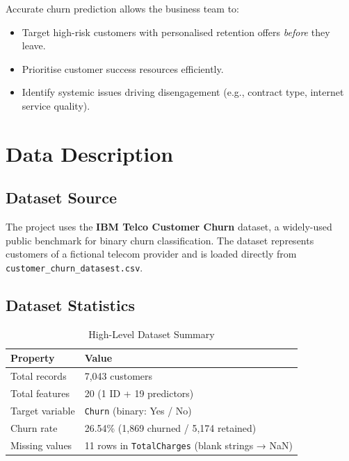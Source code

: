 \documentclass[12pt,a4paper]{article}
\begin{document}
Accurate churn prediction allows the business team to:
\begin{itemize}[leftmargin=2em]
    \item Target high-risk customers with personalised retention offers \emph{before} they leave.
    \item Prioritise customer success resources efficiently.
    \item Identify systemic issues driving disengagement (e.g., contract type, internet service quality).
\end{itemize}

\section{Data Description}

\subsection{Dataset Source}

The project uses the \textbf{IBM Telco Customer Churn} dataset, a widely-used public benchmark for binary churn classification. The dataset represents customers of a fictional telecom provider and is loaded directly from \texttt{customer\_churn\_datasest.csv}.

\subsection{Dataset Statistics}

\begin{table}[H]
\centering
\caption{High-Level Dataset Summary}
\begin{tabular}{ll}
    \toprule
    \textbf{Property} & \textbf{Value} \\
    \midrule
    Total records     & 7,043 customers \\
    Total features    & 20 (1 ID + 19 predictors) \\
    Target variable   & \texttt{Churn} (binary: Yes / No) \\
    Churn rate        & 26.54\% (1,869 churned / 5,174 retained) \\
    Missing values    & 11 rows in \texttt{TotalCharges} (blank strings → NaN) \\
    \bottomrule
\end{tabular}
\end{table}
\end{document}
